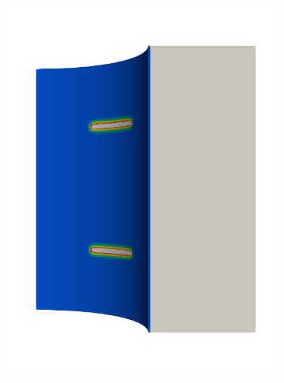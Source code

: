 \begin{frame}
\begin{columns}[T]
\begin{column}{0.6\textwidth}
\begin{figure}
{\begin{subfigure}{0.19\textwidth}
            \includegraphics[width=\textwidth]{Chapter345/figures/seed_d_1}
          \end{subfigure}
          \hspace{0.06\textwidth}
          \begin{subfigure}{0.19\textwidth}
            \centering

\end{subfigure}}
\end{figure}
\end{column}
\end{columns}
\end{frame}

